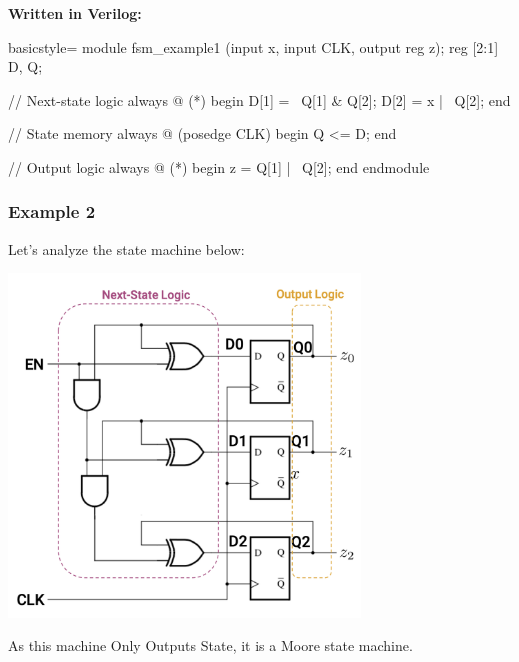 \documentclass[12pt,openany]{book}
\begin{document}
\hfill
\begin{minipage}{0.4\textwidth}

\textbf{Written in Verilog:}\newline
\footnotesize
\begin{vhdl}{basicstyle=\footnotesize}
module fsm_example1 (input x, input CLK, output reg z);
	reg [2:1] D, Q;

	// Next-state logic
	always @ (*) begin
		D[1] = ~Q[1] & Q[2];
		D[2] = x | ~Q[2];
	end

	// State memory
	always @ (posedge CLK) begin
		Q <= D;
	end

	// Output logic
	always @ (*) begin
		z = Q[1] | ~Q[2];
	end
endmodule	
\end{vhdl}
\end{minipage}

\subsubsection{Example 2}
Let's analyze the state machine below: \newline
\begin{center}
	\includegraphics[width=0.7\textwidth]{circuits/13.2_3.png}
\end{center}
As this machine Only Outputs State, it is a Moore state machine.\newline 
\end{document}
